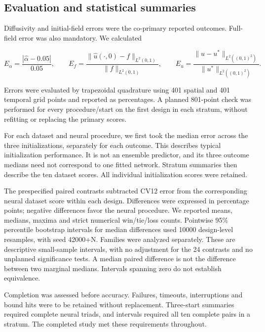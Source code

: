 \documentclass[10pt,a4paper]{article}
\begin{document}
\subsection{Evaluation and statistical summaries}

Diffusivity and initial-field errors were the co-primary reported outcomes.
Full-field error was also mandatory. We calculated

\begin{equation}
E_\alpha=\frac{|\widehat\alpha-0.05|}{0.05},\qquad
E_f=\frac{\lVert\widehat u(\cdot,0)-f\rVert_{L^2(0,1)}}
                 {\lVert f\rVert_{L^2(0,1)}},\qquad
E_u=\frac{\lVert\widehat u-u^*\rVert_{L^2((0,1)^2)}}
                 {\lVert u^*\rVert_{L^2((0,1)^2)}}.
\end{equation}

Errors were evaluated by trapezoidal quadrature using 401 spatial and 401
temporal grid points and reported as percentages. A planned 801-point check
was performed for every procedure/start on the first design in each stratum,
without refitting or replacing the primary scores.

For each dataset and neural procedure, we first took the median error across
the three initializations, separately for each outcome. This describes typical
initialization performance. It is not an ensemble predictor, and its three
outcome medians need not correspond to one fitted network. Stratum summaries
then describe the ten dataset scores. All individual initialization scores were
retained.

The prespecified paired contrasts subtracted CV12 error from the corresponding
neural dataset score within each design. Differences were expressed in percentage
points; negative differences favor the neural procedure. We reported means,
medians, maxima and strict numerical win/tie/loss counts. Pointwise 95\% percentile
bootstrap intervals for median differences used 10000 design-level resamples,
with seed 42000+N. Families were analyzed separately. These are descriptive
small-sample intervals, with no adjustment for the 24 contrasts and no unplanned
significance tests. A median paired difference is not the difference between
two marginal medians. Intervals spanning zero do not establish equivalence.

Completion was assessed before accuracy. Failures, timeouts, interruptions and
bound hits were to be retained without replacement. Three-start summaries
required complete neural triads, and intervals required all ten complete pairs
in a stratum. The completed study met these requirements throughout.
\end{document}
